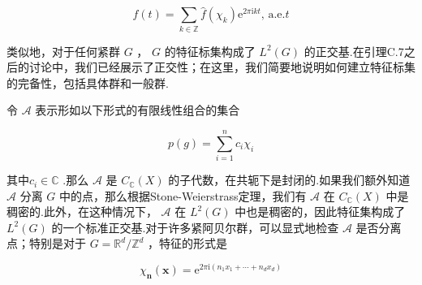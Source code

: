 \documentclass[lang=cn,a4paper,11pt,openany,scheme=chinese]{elegantbook}
\begin{document}
\[
f\left( t\right)  = \mathop{\sum }\limits_{{k \in  \mathbb{Z}}}\widehat{f}\left( {\chi }_{k}\right) {\mathrm{e}}^{{2\pi }\mathrm{i}{kt}},\,\mathrm{a.e.} t
\]


类似地，对于任何紧群 \(G\) ， \(G\) 的特征标集构成了 \({L}^{2}\left( G\right)\) 的正交基.在引理C.7之后的讨论中，我们已经展示了正交性；在这里，我们简要地说明如何建立特征标集的完备性，包括具体群和一般群.

令 \(\mathcal{A}\) 表示形如以下形式的有限线性组合的集合

\[
p\left( g\right)  = \mathop{\sum }\limits_{{i = 1}}^{n}{c}_{i}{\chi }_{i}
\]

其中\({c}_{i} \in  \mathbb{C}\) .那么 \(\mathcal{A}\) 是 \({C}_{\mathbb{C}}\left( X\right)\) 的子代数，在共轭下是封闭的.如果我们额外知道 \(\mathcal{A}\) 分离 \(G\) 中的点，那么根据Stone-Weierstrass定理，我们有 \(\mathcal{A}\) 在 \({C}_{\mathbb{C}}\left( X\right)\) 中是稠密的.此外，在这种情况下， \(\mathcal{A}\) 在 \({L}^{2}\left( G\right)\) 中也是稠密的，因此特征集构成了 \({L}^{2}\left( G\right)\) 的一个标准正交基.对于许多紧阿贝尔群，可以显式地检查 \(\mathcal{A}\) 是否分离点；特别是对于 \(G = {\mathbb{R}}^{d}/{\mathbb{Z}}^{d}\) ，特征的形式是

\[
{\chi }_{\mathbf{n}}\left( \mathbf{x}\right)  = {\mathrm{e}}^{{2\pi }\mathrm{i}\left( {{n}_{1}{x}_{1} + \cdots  + {n}_{d}{x}_{d}}\right) } \tag{C.3}
\]
\end{document}
